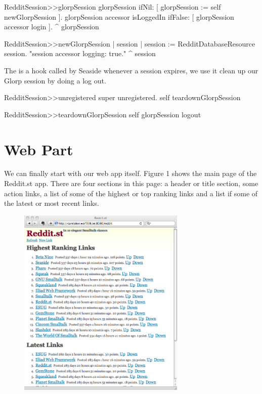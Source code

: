 \documentclass[a4paper,10pt,twoside]{book}
\begin{document}
\begin{code}{}
RedditSession>>glorpSession
   glorpSession ifNil: [ glorpSession := self newGlorpSession ]. 
   glorpSession accessor isLoggedIn ifFalse: [ glorpSession accessor login ]. 
   ^ glorpSession
\end{code}

\begin{code}{}
RedditSession>>newGlorpSession
     | session | 
     session := RedditDatabaseResource session. "session accessor logging: true." 
     ^ session
\end{code}

The  is a hook called by Seaside whenever a session expires, we use it clean up our Glorp session by doing a log out.

\begin{code}{}
RedditSession>>unregistered
     super unregistered. 
     self teardownGlorpSession
\end{code}

\begin{code}{}
RedditSession>>teardownGlorpSession
     self glorpSession logout
\end{code}

\section{Web Part}

We can finally start with our web app itself. Figure 1 shows the main page of the Reddit.st app. There are four sections in this page: a header or title section, some action links, a list of some of the highest or top ranking links and a list if some of the latest or most recent links.

\begin{figure}\begin{center}
\includegraphics[width=8cm]{redditOne}
\caption{}
\end{center}
\end{figure}

\section{}

\section{}


\ifx\wholebook\relax\else
    
    
\end{document}
